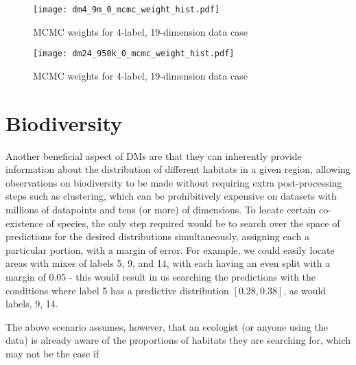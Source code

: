 
\begin{figure}[H]
    \centerline{\texttt{[image: dm4\_9m\_0\_mcmc\_weight\_hist.pdf]}}
    \caption{MCMC weights for 4-label, 19-dimension data case }
    \label{fig:4l-mcmc_weights}
\end{figure}

\begin{figure}[H]
    \centerline{\texttt{[image: dm24\_950k\_0\_mcmc\_weight\_hist.pdf]}}
    \caption{MCMC weights for 4-label, 19-dimension data case }
    \label{fig:24l-mcmc_weights}
\end{figure}

\section{Biodiversity}

Another beneficial aspect of DMs are that they can inherently provide information about the distribution of different habitats in a given region, allowing observations on biodiversity to be made without requiring extra post-processing steps such as clustering, which can be prohibitively expensive on datasets with millions of datapoints and tens (or more) of dimensions. To locate certain co-existence of species, the only step required would be to search over the space of predictions for the desired distributions simultaneously, assigning each a particular portion, with a margin of error. For example, we could easily locate areas with mixes of  labels 5, 9, and 14, with each having an even split with a margin of $0.05$ - this would result in us searching the predictions with the conditions where label 5 has a predictive distribution $[0.28, 0.38]$, as would labels, 9, 14. 


The above scenario assumes, however, that an ecologist (or anyone using the data) is already aware of the proportions of habitats they are searching for, which may not be the case if 


